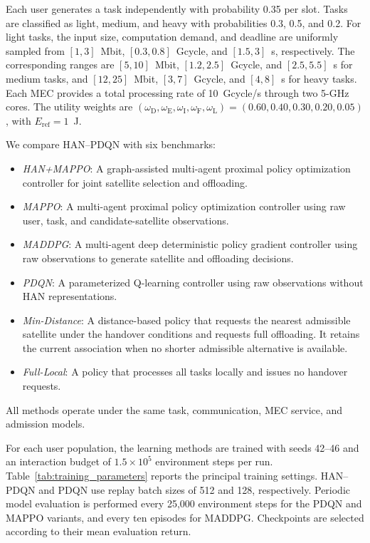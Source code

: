 \documentclass[journal]{IEEEtran}
\begin{document}
Each user generates a task independently with probability
0.35 per slot. Tasks are classified as light, medium,
and heavy with probabilities 0.3, 0.5, and 0.2.
For light tasks, the input size, computation demand,
and deadline are uniformly sampled from
$[1,3]$~Mbit, $[0.3,0.8]$~Gcycle, and $[1.5,3]$~s,
respectively. The corresponding ranges are
$[5,10]$~Mbit, $[1.2,2.5]$~Gcycle, and $[2.5,5.5]$~s
for medium tasks, and
$[12,25]$~Mbit, $[3,7]$~Gcycle, and $[4,8]$~s
for heavy tasks.
Each MEC provides a total processing rate of
10~Gcycle/s through two 5-GHz cores.
The utility weights are
$(\omega_{\mathrm D},\omega_{\mathrm E},
\omega_{\mathrm I},\omega_{\mathrm F},\omega_{\mathrm L})
=(0.60,0.40,0.30,0.20,0.05)$,
with $E_{\mathrm{ref}}=1$~J.

We compare HAN--PDQN with six benchmarks:
\begin{itemize}
    \item \textit{HAN+MAPPO}: A graph-assisted multi-agent
    proximal policy optimization controller for joint
    satellite selection and offloading.

    \item \textit{MAPPO}: A multi-agent proximal policy
    optimization controller using raw user, task, and
    candidate-satellite observations.

    \item \textit{MADDPG}: A multi-agent deep deterministic
    policy gradient controller using raw observations
    to generate satellite and offloading decisions.

    \item \textit{PDQN}: A parameterized Q-learning
    controller using raw observations without HAN
    representations.

    \item \textit{Min-Distance}: A distance-based policy
    that requests the nearest admissible satellite
    under the handover conditions and requests full
    offloading. It retains the current association
    when no shorter admissible alternative is available.

    \item \textit{Full-Local}: A policy that processes
    all tasks locally and issues no handover requests.
\end{itemize}
All methods operate under the same task, communication,
MEC service, and admission models.

For each user population, the learning methods are trained
with seeds 42--46 and an interaction budget of
$1.5\times10^5$ environment steps per run.
Table~\ref{tab:training_parameters} reports the principal
training settings.
HAN--PDQN and PDQN use replay batch sizes of 512 and 128,
respectively. Periodic model evaluation is performed
every 25,000 environment steps for the PDQN and MAPPO
variants, and every ten episodes for MADDPG.
Checkpoints are selected according to their mean
evaluation return.
\end{document}
